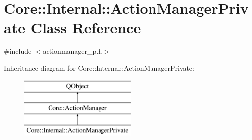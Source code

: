 \hypertarget{class_core_1_1_internal_1_1_action_manager_private}{\section{Core\-:\-:Internal\-:\-:Action\-Manager\-Private Class Reference}
\label{class_core_1_1_internal_1_1_action_manager_private}
}


{\ttfamily \#include $<$actionmanager\-\_\-p.\-h$>$}

Inheritance diagram for Core\-:\-:Internal\-:\-:Action\-Manager\-Private\-:\begin{figure}[H]
\begin{center}
\leavevmode
\includegraphics[height=3.000000cm]{class_core_1_1_internal_1_1_action_manager_private}
\end{center}
\end{figure}
